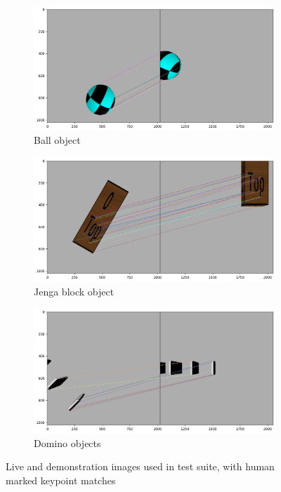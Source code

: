 \begin{figure}[h]
    \begin{subfigure}[b]{0.49\textwidth}
        \includegraphics[width=\textwidth]{figures/matchBall.png}
        \caption{Ball object}
    \end{subfigure}
    \hfill
    \begin{subfigure}[b]{0.49\textwidth}
        \includegraphics[width=\textwidth]{figures/matchJenga.png}
        \caption{Jenga block object}
    \end{subfigure}
    
    \begin{subfigure}[b]{0.49\textwidth}
        \includegraphics[width=\textwidth]{figures/matchDominoes.png}
        \caption{Domino objects}
    \end{subfigure}
    \caption{Live and demonstration images used in test suite, with human marked keypoint matches}
    \label{fig:testImages}
\end{figure}


